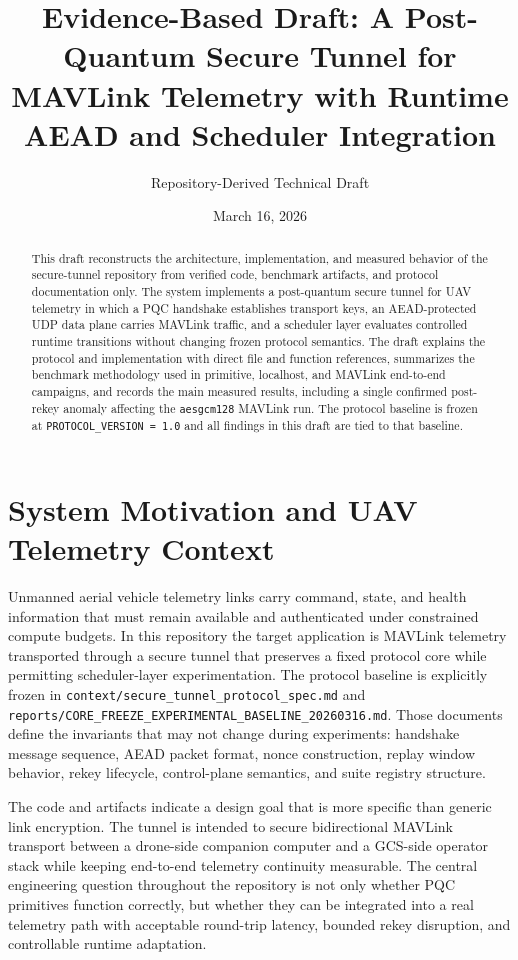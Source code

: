 \documentclass[11pt]{article}
\title{Evidence-Based Draft: A Post-Quantum Secure Tunnel for MAVLink Telemetry with Runtime AEAD and Scheduler Integration}
\author{Repository-Derived Technical Draft}
\date{March 16, 2026}
\begin{document}
\maketitle

\begin{abstract}
This draft reconstructs the architecture, implementation, and measured behavior of the secure-tunnel repository from verified code, benchmark artifacts, and protocol documentation only. The system implements a post-quantum secure tunnel for UAV telemetry in which a PQC handshake establishes transport keys, an AEAD-protected UDP data plane carries MAVLink traffic, and a scheduler layer evaluates controlled runtime transitions without changing frozen protocol semantics. The draft explains the protocol and implementation with direct file and function references, summarizes the benchmark methodology used in primitive, localhost, and MAVLink end-to-end campaigns, and records the main measured results, including a single confirmed post-rekey anomaly affecting the \texttt{aesgcm128} MAVLink run. The protocol baseline is frozen at \texttt{PROTOCOL\_VERSION = 1.0} and all findings in this draft are tied to that baseline.
\end{abstract}

\section{System Motivation and UAV Telemetry Context}
Unmanned aerial vehicle telemetry links carry command, state, and health information that must remain available and authenticated under constrained compute budgets. In this repository the target application is MAVLink telemetry transported through a secure tunnel that preserves a fixed protocol core while permitting scheduler-layer experimentation. The protocol baseline is explicitly frozen in \texttt{context/secure\_tunnel\_protocol\_spec.md} and \texttt{reports/CORE\_FREEZE\_EXPERIMENTAL\_BASELINE\_20260316.md}. Those documents define the invariants that may not change during experiments: handshake message sequence, AEAD packet format, nonce construction, replay window behavior, rekey lifecycle, control-plane semantics, and suite registry structure.

The code and artifacts indicate a design goal that is more specific than generic link encryption. The tunnel is intended to secure bidirectional MAVLink transport between a drone-side companion computer and a GCS-side operator stack while keeping end-to-end telemetry continuity measurable. The central engineering question throughout the repository is not only whether PQC primitives function correctly, but whether they can be integrated into a real telemetry path with acceptable round-trip latency, bounded rekey disruption, and controllable runtime adaptation.
\end{document}
